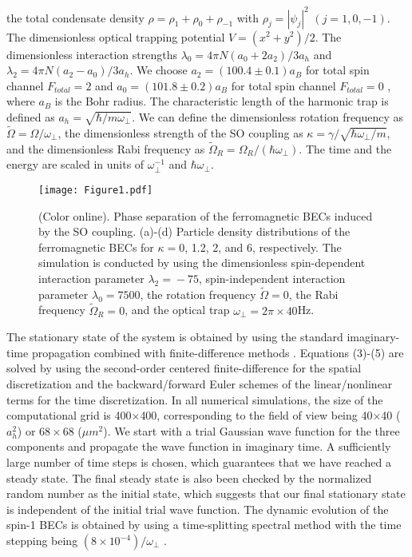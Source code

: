 \documentclass[aps,pra,showpacs,twocolumn,superscriptaddress]{revtex4-1}
\begin{document}
the total condensate density $\rho=\rho_{1}+\rho_{0}+\rho_{-1}$ with $\rho_{j}=|\psi_{j}|^{2}$ $(j=1,0,-1)$.
The dimensionless optical trapping potential $V=(x^{2}+y^{2})/2$. The dimensionless interaction strengths
$\lambda_{0}=4\pi N(a_{0}+2a_{2})/3a_{h}$ and $\lambda_{2}=4\pi N(a_{2}-a_{0})/3a_{h}$.
We choose $a_{2}=(100.4\pm0.1)a_{B}$ for
total spin channel $F_{total}=2$ and $a_{0}=(101.8\pm0.2)a_{B}$ for total
spin channel $F_{total}=0$ \cite{Kempen2002,Stamper-Kurn2013}, where $a_{B}$ is
the Bohr radius. The characteristic length of the harmonic trap is
defined as $a_{h}=\sqrt{\hbar/m\omega_{\bot}}$. We can define the dimensionless rotation frequency
as $\tilde{\Omega}=\Omega/\omega_{\bot}$, the dimensionless strength of the SO coupling
as $\kappa=\gamma/\sqrt{\hbar\omega_{\bot}/m}$, and
the dimensionless Rabi frequency as $\tilde{\Omega}_{R}=\Omega_{R}/(\hbar\omega_{\bot})$. The time and the energy are
scaled in units of $\omega_{\bot}^{-1}$ and $\hbar\omega_{\bot}$.

\begin{figure}
\texttt{[image: Figure1.pdf]}
\caption{(Color online). Phase separation of the ferromagnetic BECs induced by the SO coupling. (a)-(d) Particle density distributions of the ferromagnetic BECs for $\kappa=0$, 1.2, 2, and 6, respectively. The simulation is conducted by using the dimensionless spin-dependent interaction parameter $\lambda_{2}\!=\!-75$, spin-independent interaction parameter $\lambda_{0}\!=\!7500$, the rotation frequency $\widetilde{\Omega}=0$, the Rabi frequency $\tilde{\Omega}_{R}=0$, and the optical trap $\omega_{\bot}\!=\!2\pi\times40$Hz.} \label{Figure1}
\end{figure}

The stationary state of the system is obtained by using the standard
imaginary-time propagation combined with finite-difference methods \cite{Bao2004,Dalfovo1996}.
Equations (3)-(5) are solved by using the second-order
centered finite-difference for the spatial discretization and
the backward/forward Euler schemes of the linear/nonlinear terms for the time discretization.
In all numerical simulations, the size of the computational grid is 400$\times$400, corresponding to the field of view
being 40$\times$40 ($a_{h}^{2}$) or $68\times68$ ($\mu m^2$).
We start with a trial Gaussian
wave function for the three components and propagate the wave function in
imaginary time. A sufficiently large number of time steps is chosen, which guarantees that we have
reached a steady state. The final steady state is also been checked by the normalized random number as the initial state,
which suggests that our final stationary state is independent of the initial trial wave function. The dynamic evolution of the spin-1 BECs is
obtained by using a time-splitting spectral method with the
time stepping being $(8\times10^{-4})/\omega_{\bot}$ \cite{Wang2007,Wangtwo2007,Li2012}.
\end{document}
